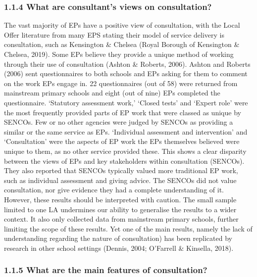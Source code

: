 \documentclass[
  english,
  man]{apa}
\begin{document}
\hypertarget{what-are-consultants-views-on-consultation}{%
\subsubsection{1.1.4 What are consultant's views on consultation?}\label{what-are-consultants-views-on-consultation}}

The vast majority of EPs have a positive view of consultation, with the Local Offer literature from many EPS stating their model of service delivery is consultation, such as Kensington \& Chelsea (Royal Borough of Kensington \& Chelsea, 2019). Some EPs believe they provide a unique method of working through their use of consultation (Ashton \& Roberts, 2006). Ashton and Roberts (2006) sent questionnaires to both schools and EPs asking for them to comment on the work EPs engage in. 22 questionnaires (out of 58) were returned from mainstream primary schools and eight (out of nine) EPs completed the questionnaire. `Statutory assessment work,' `Closed tests' and `Expert role' were the most frequently provided parts of EP work that were classed as unique by SENCOs. Few or no other agencies were judged by SENCOs as providing a similar or the same service as EPs. `Individual assessment and intervention' and `Consultation' were the aspects of EP work the EPs themselves believed were unique to them, as no other service provided these. This shows a clear disparity between the views of EPs and key stakeholders within consultation (SENCOs). They also reported that SENCOs typically valued more traditional EP work, such as individual assessment and giving advice. The SENCOs did not value consultation, nor give evidence they had a complete understanding of it. However, these results should be interpreted with caution. The small sample limited to one LA undermines our ability to generalise the results to a wider context. It also only collected data from mainstream primary schools, further limiting the scope of these results. Yet one of the main results, namely the lack of understanding regarding the nature of consultation) has been replicated by research in other school settings (Dennis, 2004; O'Farrell \& Kinsella, 2018).

\hypertarget{what-are-the-main-features-of-consultation}{%
\subsubsection{1.1.5 What are the main features of consultation?}\label{what-are-the-main-features-of-consultation}}
\end{document}
